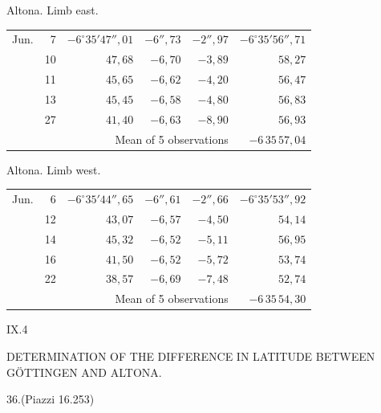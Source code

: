 \noindent\begin{minipage}[t]{.495\textwidth}\centering Altona. Limb east.\par\smallskip
{\scriptsize\setlength{\tabcolsep}{1pt}\renewcommand{\arraystretch}{1.2}\begin{tabular}{lr|r|r|r|r|}
Jun.&7&$-6^\circ35'47''{,}01$&$-6''{,}73$&$-2''{,}97$&$-6^\circ35'56''{,}71$\\
&10&$47{,}68$&$-6{,}70$&$-3{,}89$&$58{,}27$\\
&11&$45{,}65$&$-6{,}62$&$-4{,}20$&$56{,}47$\\
&13&$45{,}45$&$-6{,}58$&$-4{,}80$&$56{,}83$\\
&27&$41{,}40$&$-6{,}63$&$-8{,}90$&$56{,}93$\\
\cline{6-6}\multicolumn{5}{r}{Mean of 5 observations}&$-6\,35\,57{,}04$
\end{tabular}}\end{minipage}\hfill\begin{minipage}[t]{.495\textwidth}\centering Altona. Limb west.\par\smallskip
{\scriptsize\setlength{\tabcolsep}{1pt}\renewcommand{\arraystretch}{1.2}\begin{tabular}{lr|r|r|r|r}
Jun.&6&$-6^\circ35'44''{,}65$&$-6''{,}61$&$-2''{,}66$&$-6^\circ35'53''{,}92$\\
&12&$43{,}07$&$-6{,}57$&$-4{,}50$&$54{,}14$\\
&14&$45{,}32$&$-6{,}52$&$-5{,}11$&$56{,}95$\\
&16&$41{,}50$&$-6{,}52$&$-5{,}72$&$53{,}74$\\
&22&$38{,}57$&$-6{,}69$&$-7{,}48$&$52{,}74$\\
\cline{6-6}\multicolumn{5}{r}{Mean of 5 observations}&$-6\,35\,54{,}30$
\end{tabular}}\end{minipage}
\par\vspace{4mm}
\noindent IX.\hfill 4\par

\clearpage
\noindent{}\parbox[t]{\dimexpr\textwidth-10mm\relax}{\centering\scriptsize DETERMINATION OF THE DIFFERENCE IN LATITUDE BETWEEN GÖTTINGEN AND ALTONA.}\par
\begin{center}36.\quad (Piazzi 16.253)\end{center}


